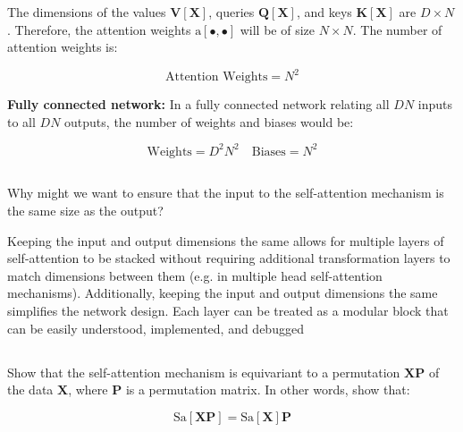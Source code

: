 \documentclass[12pt]{report}
\begin{document}
The dimensions of the values $\mathbf{V}[\mathbf{X}]$, queries $\mathbf{Q}[\mathbf{X}]$, and keys $\mathbf{K}[\mathbf{X}]$ are $D \times N$. Therefore, the attention weights $\text{a}[\bullet, \bullet]$ will be of size $N \times N$. The number of attention weights is:

\begin{equation}
    \text{Attention Weights} = N^{2}
\end{equation}

\textbf{Fully connected network:} In a fully connected network relating all $DN$ inputs to all $DN$ outputs, the number of weights and biases would be:

\begin{equation}
    \text{Weights} = D^{2}N^{2} \quad \text{Biases} = N^{2}
\end{equation}

\newpage

\subsection{}
\begin{mdframed}
    Why might we want to ensure that the input to the self-attention mechanism is the same size as the output?
\end{mdframed}

Keeping the input and output dimensions the same allows for multiple layers of self-attention to be stacked without requiring additional transformation layers to match dimensions between them (e.g. in multiple head self-attention mechanisms). Additionally, keeping the input and output dimensions the same simplifies the network design. Each layer can be treated as a modular block that can be easily understood, implemented, and debugged

\subsection{}
\begin{mdframed}
    Show that the self-attention mechanism is equivariant to a permutation $\mathbf{XP}$ of the data $\mathbf{X}$, where $\mathbf{P}$ is a permutation matrix. In other words, show that:

    \begin{equation*}
        \text{Sa}[\mathbf{XP}] = \text{Sa}[\mathbf{X}]\mathbf{P}
    \end{equation*}
\end{mdframed}
\end{document}

